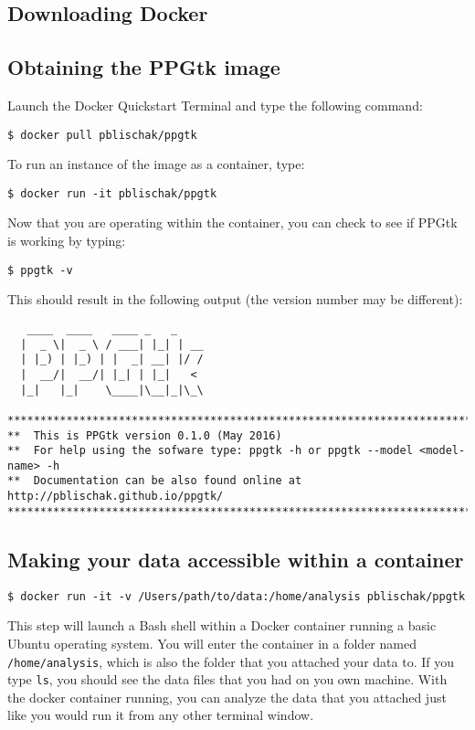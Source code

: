 \documentclass[11pt,english,letterpaper,oneside]{article}
\newcommand{\code}[1]{\hspace{5pt} \texttt{\$ #1}}
\begin{document}
\subsection{Downloading Docker}

\subsection{Obtaining the PPGtk image}

Launch the Docker Quickstart Terminal and type the following command:

\code{docker pull pblischak/ppgtk}

To run an instance of the image as a container, type:

\code{docker run -it pblischak/ppgtk}

Now that you are operating within the container, you can check to see if PPGtk is working by typing:

\code{ppgtk -v}

This should result in the following output (the version number may be different):

\begin{framed}

\begin{verbatim}
   ____  ____   ____ _   _    
  |  _ \|  _ \ / ___| |_| | __
  | |_) | |_) | |  _| __| |/ / 
  |  __/|  __/| |_| | |_|   <  
  |_|   |_|    \____|\__|_|\_\

********************************************************************************
**  This is PPGtk version 0.1.0 (May 2016)
**  For help using the sofware type: ppgtk -h or ppgtk --model <model-name> -h
**  Documentation can be also found online at http://pblischak.github.io/ppgtk/
********************************************************************************
\end{verbatim}

\end{framed}

\subsection{Making your data accessible within a container}

\code{docker run -it -v /Users/path/to/data:/home/analysis pblischak/ppgtk}

This step will launch a Bash shell within a Docker container running a basic Ubuntu operating system. You will enter the container in a folder named \texttt{/home/analysis}, which is also the folder that you attached your data to. If you type \texttt{ls}, you should see the data files that you had on you own machine. With the docker container running, you can analyze the data that you attached just like you would run it from any other terminal window.
\end{document}
